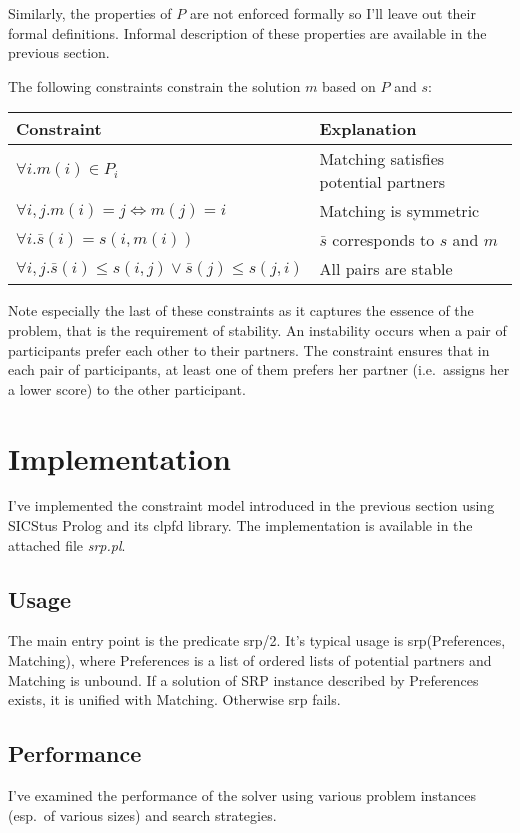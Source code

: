 \documentclass{article}
\begin{document}
Similarly, the properties of $P$ are not enforced formally so I'll leave out their
formal definitions.
Informal description of these properties are available in the previous section.

The following constraints constrain the solution $m$ based on $P$ and $s$:

\begin{tabular}{l | l}
Constraint & Explanation \\
\hline
$\forall i. m(i) \in P_i$ & Matching satisfies potential partners \\
$\forall i,j. m(i) = j \Leftrightarrow m(j) = i$ & Matching is symmetric \\
$\forall i. \bar{s}(i) = s(i, m(i))$ & $\bar{s}$ corresponds to $s$ and $m$ \\
$\forall i,j. \bar{s}(i) \leq s(i,j) \vee \bar{s}(j) \leq s(j,i)$ & All pairs are stable
\end{tabular}

Note especially the last of these constraints
as it captures the essence of the problem, that is the requirement of stability.
An instability occurs when a pair of participants prefer each other to their partners.
The constraint ensures that in each pair of participants,
at least one of them prefers her partner (i.e.~assigns her a lower score)
to the other participant.

\section{Implementation}
I've implemented the constraint model introduced in the previous section
using SICStus Prolog and its clpfd library.
The implementation is available in the attached file \emph{srp.pl}.

\subsection{Usage}
The main entry point is the predicate srp/2.
It's typical usage is srp(Preferences, Matching),
where Preferences is a list of ordered lists of potential partners
and Matching is unbound.
If a solution of SRP instance described by Preferences exists,
it is unified with Matching.
Otherwise srp fails.

\subsection{Performance}
I've examined the performance of the solver using various problem instances
(esp.~of various sizes) and search strategies.
\end{document}
